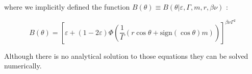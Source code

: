 \documentclass[12pt,a4paperpaper,]{tufte-book}
\begin{document}
where we implicitly defined the function \(B(\theta) \equiv B(\theta| \varepsilon, \Gamma, m, r, \beta\nu)\) :

\[ B(\theta) = \left[ \varepsilon + \left(1 - 2\varepsilon\right)  \Phi \left( \frac1\Gamma \left( r\cos\theta + \mathrm{sign} \left( \cos\theta \right)  m \right) \right) \right]^{\beta \nu \Gamma^2} \]

Although there is no analytical solution to those equations they can be solved numerically.
\end{document}

